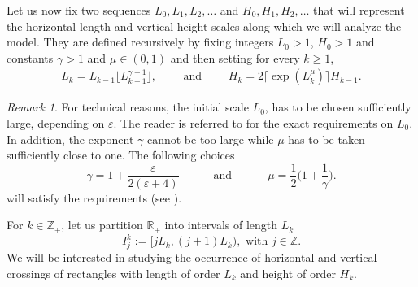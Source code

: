 \documentclass[a4paper,oneside,12pt]{amsart}
\renewcommand{\geq}{\geqslant}
\theoremstyle{plain}
\theoremstyle{definition}
\theoremstyle{remark}
\newtheorem{remark}{Remark}
\begin{document}


Let us now fix two sequences $L_0, L_1, L_2, \ldots$ and $H_0, H_1, H_2, \ldots$ that will represent the horizontal length and vertical height scales along which we will analyze the model.
They are defined recursively by fixing integers $L_0 > 1$, $H_0 >1$ and constants $\gamma >1$ and $\mu \in (0,1)$ and then setting for every $k\geq1$,
\begin{eqnarray}
\label{Lk}  
L_k=L_{k-1}\lfloor L_{k-1}^{\gamma-1}\rfloor, \qquad \textrm{ and } \qquad  H_k=2\lceil \exp(L_k^\mu)\rceil H_{k-1}.
\end{eqnarray}

\begin{remark} 
For technical reasons, the initial scale $L_0$, has to be chosen sufficiently large, depending on $\varepsilon$.
The reader is referred to \cite[Conditions (i), (ii) and (iii), pp.\ 3153]{Hilario2023} for the exact requirements on $L_0$.
In addition, the exponent $\gamma$ cannot be too large while $\mu$ has to be taken sufficiently close to one.
The following choices
\begin{equation}
\label{e:def_gamma_mu}
 \gamma = 1+\frac{\varepsilon}{2(\varepsilon +4)} \,\,\,\,\,\,\,\,\,\,\,\,\,\,\,\, \textrm{ and }\,\,\,\,\,\,\,\,\,\,\,\,\,\,\,\,\, \mu = \frac{1}{2} \Big(1+\frac{1}{\gamma}\Big).
\end{equation}
will satisfy the requirements
(see \cite[Eq.\ (19) pp.\ 3153 and Eq.(32) pp.\ 3156]{Hilario2023}).
\end{remark}

For $k\in\mathbb{Z}_+$, let us partition $\mathbb{R}_+$ into intervals of length $L_k$
\[
I_j^k:=\big[j L_k, (j+1)L_k\big), \textrm{ with } j\in\mathbb{Z}.
\]
We will be interested in studying the occurrence of horizontal and vertical crossings of rectangles with length of order $L_k$ and height of order $H_k$.
\end{document}

